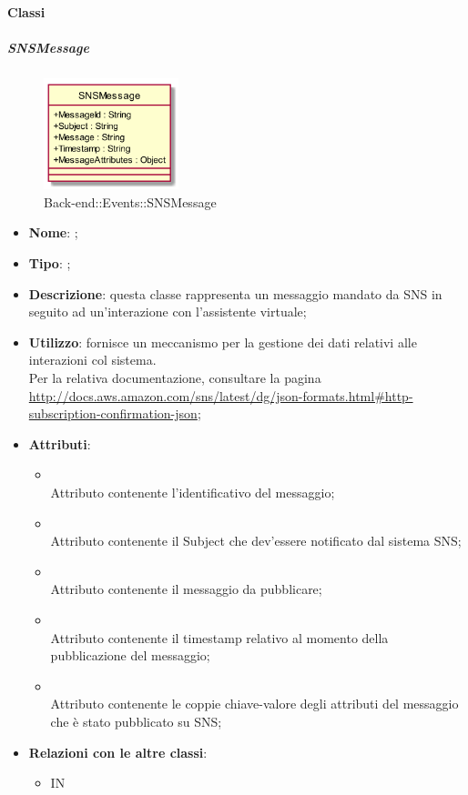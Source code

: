 \paragraph{Classi}
\hypertarget{SNSMessage_label}{\subparagraph{SNSMessage}}
\begin{figure}[h]
	\centering
	\includegraphics[width=0.35\textwidth,height=\textheight,keepaspectratio]{images/ClassSNSMessage.png}
	\caption{Back-end::Events::SNSMessage}
\end{figure}
\begin{itemize}
	\item \textbf{Nome}: ;
	\item \textbf{Tipo}: ;
	\item \textbf{Descrizione}: questa classe rappresenta un messaggio mandato da SNS in seguito ad un'interazione con l'assistente virtuale;
	\item \textbf{Utilizzo}: fornisce un meccanismo  per la gestione dei dati relativi alle interazioni col sistema.\\
Per la relativa documentazione, consultare la pagina \url{http://docs.aws.amazon.com/sns/latest/dg/json-formats.html#http-subscription-confirmation-json};
	\item \textbf{Attributi}:
	\begin{itemize}
		\item[]  \\
		Attributo contenente l'identificativo del messaggio;
		\item[]  \\
		Attributo contenente il Subject che dev'essere notificato dal sistema SNS;
		\item[]  \\
		Attributo contenente il messaggio da pubblicare;
		\item[]  \\
		Attributo contenente il timestamp relativo al momento della pubblicazione del messaggio;
		\item[]  \\
		Attributo contenente le coppie chiave-valore degli attributi del messaggio che è stato pubblicato su SNS;
	\end{itemize}
	\item \textbf{Relazioni con le altre classi}:
	\begin{itemize}
		\item IN \hyperlink{SNSRecord_label}{}
	\end{itemize}
\end{itemize}
\FloatBarrier

